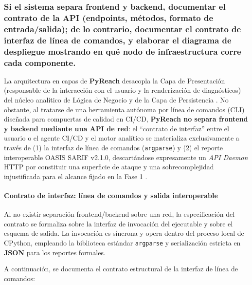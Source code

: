 \subsubsection{Si el sistema separa frontend y backend, documentar el contrato de la API (endpoints, métodos, formato de entrada/salida); de lo contrario, documentar el contrato de interfaz de línea de comandos, y elaborar el diagrama de despliegue mostrando en qué nodo de infraestructura corre cada componente.}
La arquitectura en capas de \textbf{PyReach} desacopla la Capa de Presentación (responsable de la interacción con el usuario y la renderización de diagnósticos) del núcleo analítico de Lógica de Negocio y de la Capa de Persistencia \cite{martin2017cleanarch, pressman2020software}. No obstante, al tratarse de una herramienta autónoma por línea de comandos (CLI) diseñada para compuertas de calidad en CI/CD, \textbf{PyReach no separa frontend y backend mediante una API de red}: el ``contrato de interfaz'' entre el usuario o el agente CI/CD y el motor analítico se materializa exclusivamente a través de (1) la interfaz de línea de comandos (\texttt{argparse}) y (2) el reporte interoperable OASIS SARIF v2.1.0, descartándose expresamente un \textit{API Daemon} HTTP por constituir una superficie de ataque y una sobrecomplejidad injustificada para el alcance fijado en la Fase 1 \cite{humble2010continuous, torres2026proyecto}.

\paragraph*{Contrato de interfaz: línea de comandos y salida interoperable}
Al no existir separación frontend/backend sobre una red, la especificación del contrato se formaliza sobre la interfaz de invocación del ejecutable y sobre el esquema de salida. La invocación es síncrona y opera dentro del proceso local de CPython, empleando la biblioteca estándar \texttt{argparse} y serialización estricta en \textbf{JSON} para los reportes formales.

A continuación, se documenta el contrato estructural de la interfaz de línea de comandos:


